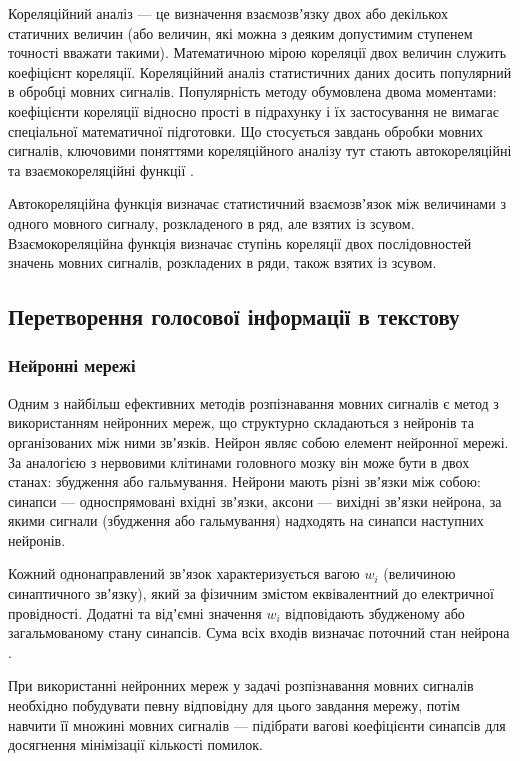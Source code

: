 Кореляційний аналіз --- це визначення взаємозвʼязку двох або декількох статичних величин (або величин, які можна з деяким допустимим ступенем точності вважати такими). Математичною мірою кореляції двох величин служить коефіцієнт кореляції. Кореляційний аналіз статистичних даних досить популярний в обробці мовних сигналів. Популярність методу обумовлена ​​двома моментами: коефіцієнти кореляції відносно прості в підрахунку і їх застосування не вимагає спеціальної математичної підготовки. Що стосується завдань обробки мовних сигналів, ключовими поняттями кореляційного аналізу тут стають автокореляційні та взаємокореляційні функції \cite{Баскаков_2001}.

Автокореляційна функція визначає статистичний взаємозвʼязок між величинами з одного мовного сигналу, розкладеного в ряд, але взятих із зсувом. Взаємокореляційна функція визначає ступінь кореляції двох послідовностей значень мовних сигналів, розкладених в ряди, також взятих із зсувом.

\subsection{Перетворення голосової інформації в текстову}

\subsubsection{Нейронні мережі}

Одним з найбільш ефективних методів розпізнавання мовних сигналів є метод з використанням нейронних мереж, що структурно складаються з нейронів та організованих між ними звʼязків. Нейрон являє собою елемент нейронної мережі. За аналогією з нервовими клітинами головного мозку він може бути в двох станах: збудження або гальмування. Нейрони мають різні звʼязки між собою: синапси --- односпрямовані вхідні звʼязки, аксони --- вихідні звʼязки нейрона, за якими сигнали (збудження або гальмування) надходять на синапси наступних нейронів.

Кожний однонаправлений звʼязок характеризується вагою $w_i$ (величиною синаптичного звʼязку), який за фізичним змістом еквівалентний до електричної провідності. Додатні та відʼємні значення $w_i$ відповідають збудженому або загальмованому стану синапсів. Сума всіх входів визначає поточний стан нейрона \cite{Чураков_2014}.

При використанні нейронних мереж у задачі розпізнавання мовних сигналів необхідно побудувати певну відповідну для цього завдання мережу, потім навчити її множині мовних сигналів --- підібрати вагові коефіцієнти синапсів для досягнення мінімізації кількості помилок.

